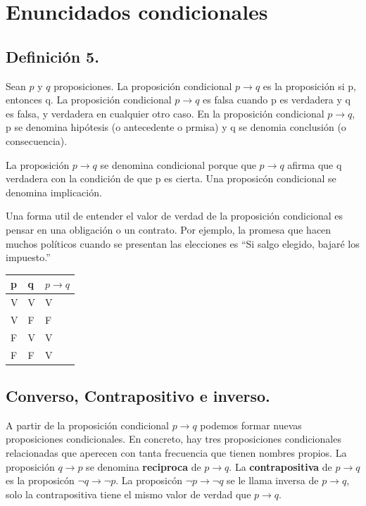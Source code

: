 \documentclass[
  letterpaper,
  DIV=11,
  numbers=noendperiod]{scrartcl}
\begin{document}
\section{Enuncidados condicionales}\label{enuncidados-condicionales}

\subsection{Definición 5.}\label{definiciuxf3n-5.}

Sean \(p\) y \(q\) proposiciones. La proposición condicional \(p \to q\)
es la proposición si p, entonces q. La proposición condicional
\(p \to q\) es falsa cuando p es verdadera y q es falsa, y verdadera en
cualquier otro caso. En la proposición condicional \(p \to q\), p se
denomina hipótesis (o antecedente o prmisa) y q se denomia conclusión (o
consecuencia).

La proposición \(p \to q\) se denomina condicional porque que
\(p \to q\) afirma que q verdadera con la condición de que p es cierta.
Una proposicón condicional se denomina implicación.

Una forma util de entender el valor de verdad de la proposición
condicional es pensar en una obligación o un contrato. Por ejemplo, la
promesa que hacen muchos políticos cuando se presentan las elecciones es
``Si salgo elegido, bajaré los impuesto.''

\begin{longtable}[]{@{}lll@{}}
\toprule\noalign{}
p & q & \(p \to q\) \\
\midrule\noalign{}
\endhead
\bottomrule\noalign{}
\endlastfoot
V & V & V \\
V & F & F \\
F & V & V \\
F & F & V \\
\end{longtable}

\subsection{Converso, Contrapositivo e
inverso.}\label{converso-contrapositivo-e-inverso.}

A partir de la proposición condicional \(p \to q\) podemos formar nuevas
proposiciones condicionales. En concreto, hay tres proposiciones
condicionales relacionadas que aperecen con tanta frecuencia que tienen
nombres propios. La proposición \(q \to p\) se denomina
\textbf{reciproca} de \(p \to q\). La \textbf{contrapositiva} de
\(p \to q\) es la proposicón \(\neg q \to \neg p\). La proposicón
\(\neg p \to \neg q\) se le llama inversa de \(p \to q\), solo la
contrapositiva tiene el mismo valor de verdad que \(p \to q\).
\end{document}
